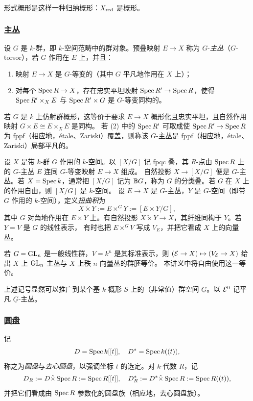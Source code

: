 \begin{ex}
形式概形是这样一种归纳概形：$X_{\operatorname{red}}$ 是概形。
\end{ex}

\subsubsection{主丛}\label{Intro:torsor}

设 $G$ 是 $k$-群，即 $k$-空间范畴中的群对象。预叠映射 $E\to X$ 称为 $G$-\emph{主丛}（$G$-torsor），若 $G$ 作用在 $E$ 上，并且：
\begin{enumerate}
\item 映射 $E\to X$ 是 $G$-等变的（其中 $G$ 平凡地作用在 $X$ 上）；
\item 对每个 $\operatorname{Spec} R\to X$，存在忠实平坦映射 $\operatorname{Spec} R'\to\operatorname{Spec} R$，使得 $\operatorname{Spec} R'\times_XE$ 与 $\operatorname{Spec} R'\times G$ 是 $G$-等变同构的。
\end{enumerate}
若 $G$ 是 $k$ 上仿射群概形，这等价于要求 $E\to X$ 概形化且忠实平坦，且自然作用映射 $G\times E\cong E\times_X E$ 是同构。
若 (2) 中的 $\operatorname{Spec} R'$ 可取成使 $\operatorname{Spec} R'\to\operatorname{Spec} R$ 为 fppf（相应地，\'etale、Zariski）覆盖，则称该 $G$-主丛是 fppf（相应地，\'etale、Zariski）局部平凡的。

设 $X$ 是带 $k$-群 $G$ 作用的 $k$-空间。以 $[X/G]$ 记 fpqc 叠，其 $R$-点由 $\operatorname{Spec} R$ 上的 $G$-主丛 $E$ 连同 $G$-等变映射 $E\to X$ 组成。
自然投影 $X\to[X/G]$ 便是 $G$-主丛。若 $X=\operatorname{Spec} k$，通常把 $[X/G]$ 记为 ${\mathbb B} G$，称为 $G$ 的分类叠。若 $G$ 在 $X$ 上的作用自由，则 $[X/G]$ 是 $k$-空间。
设 $E\to X$ 是 $G$-主丛，$Y$ 是 $G$-空间（即带 $G$ 作用的 $k$-空间），定义\emph{扭曲积}为
\[
X\tilde\times Y:= E\times^G Y:=[E\times Y/G],
\]
其中 $G$ 对角地作用在 $E\times Y$ 上。有自然投影 $X\tilde\times Y\to X$，其纤维同构于 $Y$。若 $Y=V$ 是 $G$ 的线性表示，
有时也把 $E\times^GV$ 写成 $V_E$，并把它看成 $X$ 上的向量丛。

若 $G={\operatorname{GL}}_n$ 是一般线性群，$V=k^n$ 是其标准表示，则 $({\mathcal E}\to X)\mapsto(V_{\mathcal E}\to X)$ 给出 $X$ 上 ${\operatorname{GL}}_n$-主丛与 $X$ 上秩 $n$ 向量丛的群胚等价。
本讲义中将自由使用这一等价。

上述记号显然可以推广到某个基 $k$-概形 $S$ 上的（非常值）群空间 $\underline G$。以 ${\mathcal E}^0$ 记平凡 $\underline G$-主丛。

\subsubsection{圆盘}\label{Intro:disc}

记
\[
D=\operatorname{Spec} k[[t]],\quad D^*=\operatorname{Spec} k((t)),
\]
称之为\emph{圆盘}与\emph{去心圆盘}，以强调坐标 $t$ 的选定。对 $k$-代数 $R$，记
\[
D_R:= D\hat\times\operatorname{Spec} R:=\operatorname{Spec} R[[t]], \quad D_R^*:= D^*\hat\times \operatorname{Spec} R:= \operatorname{Spec} R((t)),
\]
并把它们看成由 $\operatorname{Spec} R$ 参数化的圆盘族（相应地，去心圆盘族）。

